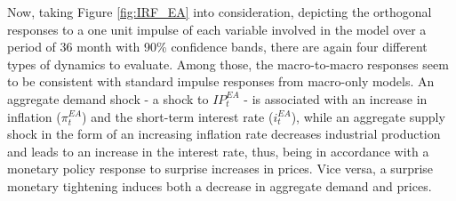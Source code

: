 Now, taking Figure \ref{fig:IRF_EA} into consideration, depicting the orthogonal responses to a one unit impulse of each variable involved in the model over a period of 36 month with 90\% confidence bands, there are again four different types of dynamics to evaluate. 
Among those, the macro-to-macro responses seem to be consistent with standard impulse responses from macro-only models. 
An aggregate demand shock - a shock to $IP^{EA}_{t}$ - is associated with an increase in inflation ($\pi^{EA}_{t}$) and the short-term interest rate ($i^{EA}_{t}$), while an aggregate supply shock in the form of an increasing inflation rate decreases industrial production and leads to an increase in the interest rate, thus, being in accordance with a monetary policy response to surprise increases in prices. 
Vice versa, a surprise monetary tightening induces both a decrease in aggregate demand and prices. 

